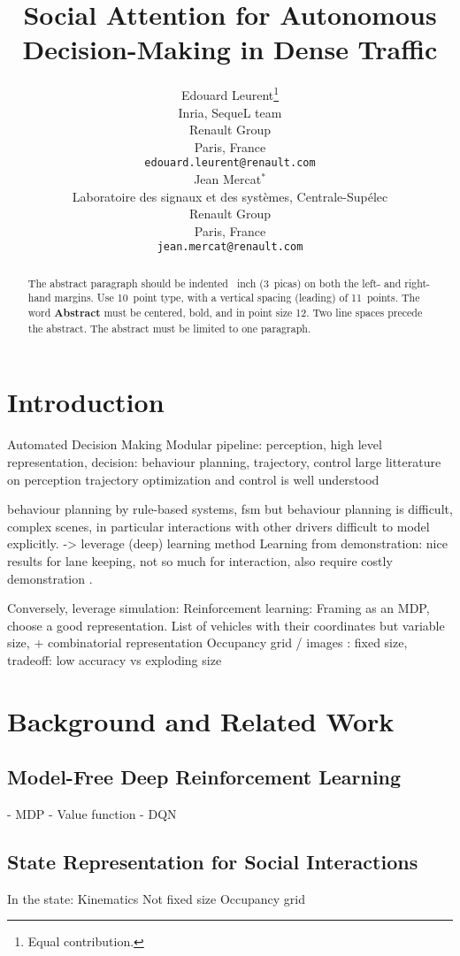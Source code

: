 \documentclass{article}
\title{Social Attention for Autonomous Decision-Making in Dense Traffic}
\author{%
  Edouard Leurent\thanks{Equal contribution.} \\
  Inria, SequeL team\\
  Renault Group\\
  Paris, France\\
  \texttt{edouard.leurent@renault.com} \\
   \And
  Jean Mercat$^*$ \\
  Laboratoire des signaux et des syst\`emes,
  Centrale-Sup\'elec\\
  Renault Group\\
  Paris, France\\
  \texttt{jean.mercat@renault.com} \\
}
\begin{document}
\maketitle

\begin{abstract}
  The abstract paragraph should be indented ~inch (3~picas) on
  both the left- and right-hand margins. Use 10~point type, with a vertical
  spacing (leading) of 11~points.  The word \textbf{Abstract} must be centered,
  bold, and in point size 12. Two line spaces precede the abstract. The abstract
  must be limited to one paragraph.
\end{abstract}

\section{Introduction}

Automated Decision Making
Modular pipeline: perception, high level representation, decision: behaviour planning, trajectory, control
large litterature on perception
trajectory optimization and control is well understood

behaviour planning by rule-based systems, fsm
but behaviour planning is difficult, complex scenes, in particular interactions with other drivers difficult to model explicitly.
 -> leverage (deep) learning method
Learning from demonstration: nice results for lane keeping, not so much for interaction, also require costly demonstration . 

Conversely, leverage simulation:
Reinforcement learning:
Framing as an MDP, choose a good representation.
List of vehicles with their coordinates 
but variable size, + combinatorial representation
Occupancy grid / images : fixed size, tradeoff:  low accuracy vs exploding size

\section{Background and Related Work}

\subsection{Model-Free Deep Reinforcement Learning}

- MDP
- Value function
- DQN

\subsection{State Representation for Social Interactions}
In the state:
Kinematics
Not fixed size
Occupancy grid
\end{document}

